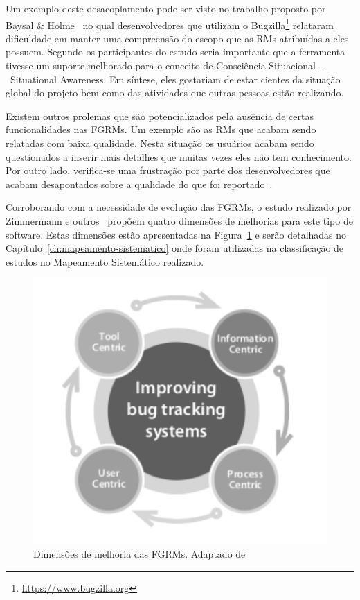 Um exemplo deste desacoplamento pode ser visto no trabalho proposto por Baysal
\& Holme~\cite{baysal2012qualitative} no qual desenvolvedores que utilizam o
Bugzilla\footnote{\url{https://www.bugzilla.org}} relataram dificuldade em
manter uma compreensão do escopo que as RMs atribuídas a eles possuem. Segundo
os participantes do estudo seria importante que a ferramenta tivesse um suporte
melhorado para o conceito de Consciência Situacional~-~Situational Awareness. Em
síntese, eles gostariam de estar cientes da situação global do projeto bem como
das atividades que outras pessoas estão realizando.

Existem outros prolemas que são potencializados pela ausência de certas
funcionalidades nas FGRMs. Um exemplo são as RMs que acabam sendo relatadas com
baixa qualidade. Nesta situação os usuários acabam sendo questionados a inserir
mais detalhes que muitas vezes eles não tem conhecimento. Por outro lado,
verifica-se uma frustração por parte dos desenvolvedores que acabam desapontados
sobre a qualidade do que foi reportado~\cite{just2008towards}.

Corroborando com a necessidade de evolução das FGRMs, o estudo realizado por
Zimmermann e outros~\cite{zimmermann2009improving} propõem quatro dimensões de
melhorias para este tipo de software. Estas dimensões estão apresentadas na
Figura~\ref{fig:dimensoes_melhorias_fgrm} e serão detalhadas no
Capítulo~\ref{ch:mapeamento-sistematico} onde foram utilizadas na classificação
de estudos no Mapeamento Sistemático realizado.


\begin{figure}[htpb] \centering
	\includegraphics[width=0.666666\linewidth]
	{chapter-intro/img/dimensoes_melhorias_fgrm.pdf}
	\caption{Dimensões de melhoria das FGRMs. Adaptado
		de~\cite{zimmermann2005mining}}\label{fig:dimensoes_melhorias_fgrm}
\end{figure}

